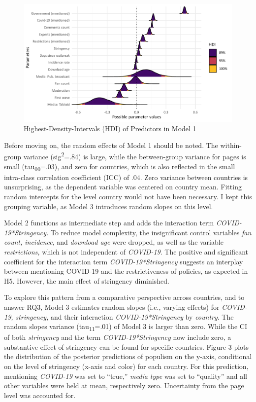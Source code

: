 \documentclass[
]{ccr}
\begin{document}
\begin{figure}

{\centering \includegraphics{plots/hdi_m3b_20231130.pdf}

}

\caption{Highest-Density-Intervals (HDI) of Predictors in Model 1}

\end{figure}

Before moving on, the random effects of Model 1 should be noted. The
within-group variance (sig\textsuperscript{2}=.84) is large, while the
between-group variance for pages is small (tau\textsubscript{00}=.03),
and zero for countries, which is also reflected in the small intra-class
correlation coefficient (ICC) of .04. Zero variance between countries is
unsurprising, as the dependent variable was centered on country mean.
Fitting random intercepts for the level country would not have been
necessary. I kept this grouping variable, as Model 3 introduces random
slopes on this level.

Model 2 functions as intermediate step and adds the interaction term
\emph{COVID-19*Stringency.} To reduce model complexity, the
insignificant control variables \emph{fan count, incidence}, and
\emph{download age} were dropped, as well as the variable
\emph{restrictions,} which is not independent of \emph{COVID-19}. The
positive and significant coefficient for the interaction term
\emph{COVID-19*Stringency} suggests an interplay between mentioning
COVID-19 and the restrictiveness of policies, as expected in H5.
However, the main effect of stringency diminished.

To explore this pattern from a comparative perspective across countries,
and to answer RQ3, Model 3 estimates random slopes (i.e., varying
effects) for \emph{COVID-19, stringency,} and their interaction
\emph{COVID-19*Stringency} by \emph{country}. The random slopes variance
(tau\textsubscript{11}=.01) of Model 3 is larger than zero. While the CI
of both \emph{stringency} and the term \emph{COVID-19*Stringency} now
include zero, a substantive effect of stringency can be found for
specific countries. Figure 3 plots the distribution of the posterior
predictions of populism on the y-axis, conditional on the level of
stringency (x-axis and color) for each country. For this prediction,
mentioning \emph{COVID-19} was set to ``true,'' \emph{media type} was
set to ``quality'' and all other variables were held at mean,
respectively zero. Uncertainty from the page level was accounted for.
\end{document}

